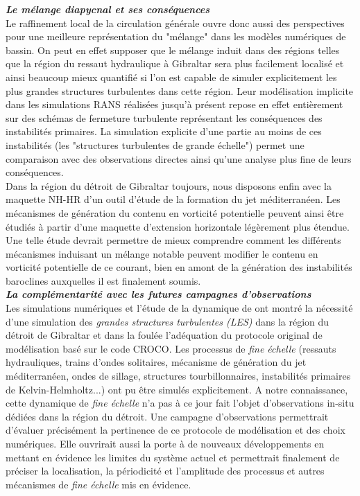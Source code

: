 \documentclass[a4paper,11pt]{report}
\begin{document}
\noindent\textit{\textbf{Le mélange diapycnal et ses conséquences}}\\
Le raffinement local de la circulation générale ouvre donc aussi des perspectives pour une meilleure représentation du "mélange" dans les modèles numériques de bassin. On peut en effet supposer que le mélange induit dans des régions telles que la région du ressaut hydraulique à Gibraltar sera plus facilement localisé et ainsi beaucoup mieux quantifié si l'on est capable de simuler explicitement les plus grandes structures turbulentes dans cette région. Leur modélisation implicite dans les simulations RANS réalisées jusqu'à présent repose en effet entièrement sur des schémas de fermeture turbulente représentant les conséquences des instabilités primaires. La simulation explicite d'une partie au moins de ces instabilités (les "structures turbulentes de grande échelle") permet une comparaison avec des observations directes ainsi qu'une analyse plus fine de leurs conséquences. \\
Dans la région du détroit de Gibraltar toujours, nous disposons enfin avec la maquette NH-HR d'un outil d'étude de la formation du jet méditerranéen. Les mécanismes de génération du contenu en vorticité potentielle peuvent ainsi être étudiés à partir d'une maquette d'extension horizontale légèrement plus étendue. Une telle étude devrait permettre de mieux comprendre comment les différents mécanismes induisant un mélange notable peuvent modifier le contenu en vorticité potentielle de ce courant, bien en amont de la génération des instabilités baroclines auxquelles il est finalement soumis.\\


\noindent\textit{\textbf{La complémentarité avec les futures campagnes d'observations}}\\
Les simulations numériques et l'étude de la dynamique de  ont montré la nécessité d'une simulation des \textit{grandes structures turbulentes (LES)} dans la région du détroit de Gibraltar et dans la foulée l'adéquation du protocole original de modélisation basé sur le code CROCO. Les processus de \textit{fine échelle} (ressauts hydrauliques, trains d'ondes solitaires, mécanisme de génération du jet méditerranéen, ondes de sillage, structures tourbillonnaires, instabilités primaires de Kelvin-Helmholtz...) ont pu être simulés explicitement. A notre connaissance, cette dynamique de \textit{fine échelle} n'a pas à ce jour fait l'objet d'observations in-situ dédiées dans la région du détroit. Une campagne d'observations permettrait d'évaluer précisément la pertinence de ce protocole de modélisation et des choix numériques. Elle ouvrirait aussi la porte à de nouveaux développements en mettant en évidence les limites du système actuel et permettrait finalement de préciser la localisation, la périodicité et l'amplitude des processus et autres mécanismes de \textit{fine échelle} mis en évidence.
\end{document}
